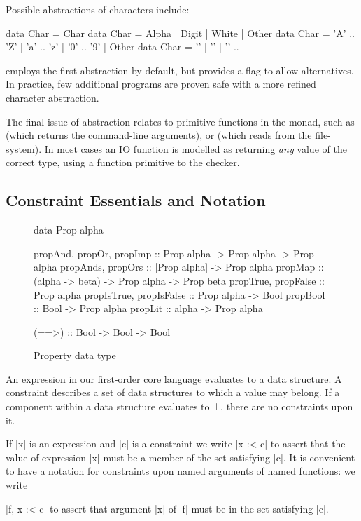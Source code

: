 Possible abstractions of characters include:

\ignore\begin{code}
data Char = Char
data Char = Alpha | Digit | White | Other
data Char = 'A' .. 'Z' | 'a' .. 'z' | '0' .. '9' | Other
data Char = '\0' | '\1' | '\2' ..
\end{code}

\noindent \catch{} employs the first abstraction by default, but provides a flag to allow alternatives. In practice, few additional programs are proven safe with a more refined character abstraction.

The final issue of abstraction relates to primitive functions in the  monad, such as  (which returns the command-line arguments), or  (which reads from the file-system). In most cases an IO function is modelled as returning \textit{any} value of the correct type, using a function primitive to the checker.

\subsection{Constraint Essentials and Notation}
\label{sec:constraints}

\begin{figure}
\begin{code}
data Prop alpha

propAnd, propOr, propImp  :: Prop alpha -> Prop alpha -> Prop alpha
propAnds, propOrs         :: [Prop alpha] -> Prop alpha
propMap                   :: (alpha -> beta) -> Prop alpha -> Prop beta
propTrue, propFalse       :: Prop alpha
propIsTrue, propIsFalse   :: Prop alpha -> Bool
propBool                  :: Bool -> Prop alpha
propLit                   :: alpha -> Prop alpha

(==>) :: Bool -> Bool -> Bool
\end{code}
\caption{Property data type}
\label{fig:prop}
\figureend
\end{figure}

An expression in our first-order core language evaluates to a data structure. A constraint describes a set of data structures to which a value may belong. If a component within a data structure evaluates to $\bot{}$, there are no constraints upon it.

If |x| is an expression and |c| is a constraint we write |x :< c| to assert that the value of expression |x| must be a member of the set satisfying |c|. It is convenient to have a notation for constraints upon named arguments of named functions: we write \ignore|f, x :< c| to assert that argument |x| of |f| must be in the set satisfying |c|.

